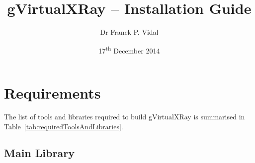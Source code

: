 \documentclass[11pt,oneside,a4paper,final]{article}
\title{gVirtualXRay -- Installation Guide}
\author{Dr Franck P. Vidal}
\date{17\textsuperscript{th} December 2014}
\begin{document}
 \sloppy

\maketitle

\newpage
{}
{}
\tableofcontents

% 
\newpage
{}
{}
\listoftables

\newpage
\section{Requirements}

The list of tools and libraries required to build gVirtualXRay is summarised in Table~\ref{tab:requiredToolsAndLibraries}.

\subsection{Main Library}
\end{document}
